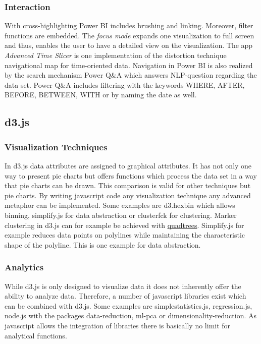 \subsubsection*{Interaction}
With cross-highlighting Power BI includes brushing and linking\cite{Power BIInteract}. Moreover, filter functions are embedded. The \textit{focus mode} expands one visualization to full screen and thus, enables the user to have a detailed view on the visualization. The app \textit{Advanced Time Slicer} is one implementation of the distortion technique navigational map for time-oriented data. Navigation in Power BI is also realized by the search mechanism Power Q&A which answers NLP-question regarding the data set. Power Q&A includes filtering with the keywords WHERE, AFTER, BEFORE, BETWEEN, WITH or by naming the date as well. 

\subsection*{d3.js}
\subsubsection*{Visualization Techniques}
In d3.js data attributes are assigned to graphical attributes. It has not only one way to present pie charts but offers functions which process the data set in a way that pie charts can be drawn. This comparison is valid for other techniques but pie charts. By writing javascript code any visualization technique any advanced metaphor can be implemented. Some examples are d3.hexbin which allows binning,  simplify.js for data abstraction or clusterfck for clustering.  
Marker clustering in d3.js can for example be achieved with \href{https://www.phase2technology.com/blog/using-d3-quadtrees-to-power-an-interactive-map-for-bonnier-corporation/}{quadtrees}\cite{Morrison2014}. Simplify.js for example reduces data points on polylines while maintaining the characteristic shape of the polyline. This is one example for data abstraction.

\subsubsection*{Analytics}
While d3.js is only designed to visualize data it does not inherently offer the ability to analyze data. Therefore, a number of javascript libraries exist which can be combined with d3.js. Some examples are simplestatistics.js, regression.js, node.js with the packages data-reduction, ml-pca or dimensionality-reduction. 
As javascript allows the integration of libraries there is basically no limit for analytical functions. 

